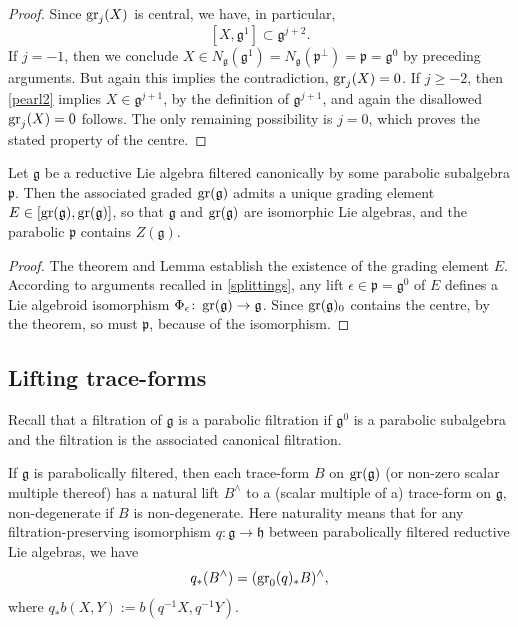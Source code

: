 \documentclass[leqno,12pt]{amsart} %
\begin{document}
\begin{proof}
  Since $\operatorname{\operatorname{gr}}_j(X)$ is central, we have, in particular,
  \begin{equation}
    \label{pearl2}
    [X, {\mathfrak g}^1] \subset {\mathfrak g}^{j+2}.
  \end{equation}
  If $j = -1$, then we conclude $X \in N_{\mathfrak g}({\mathfrak g}^1)=N_{\mathfrak g}({\mathfrak p}^\perp)={\mathfrak p}={\mathfrak g}^0$ by preceding arguments. But again this implies the contradiction, $\operatorname{\operatorname{gr}}_j(X)=0$.  If $j\ge -2$, then \eqref{pearl2} implies $X \in {\mathfrak g}^{j+1}$, by the definition of ${\mathfrak g}^{j+1}$, and again the disallowed $\operatorname{\operatorname{gr}}_j(X)=0$ follows. The only remaining possibility is $j=0$, which proves the stated property of the centre.
\end{proof}
\begin{corollary}
  Let ${\mathfrak g} $ be a reductive Lie algebra filtered canonically by some parabolic
  subalgebra ${\mathfrak p}$. Then the associated graded $\operatorname{\operatorname{gr}}({\mathfrak g})$ admits a
  unique grading element $E \in [\operatorname{\operatorname{gr}}({\mathfrak g}), \operatorname{\operatorname{gr}}({\mathfrak g})]$, so that
  ${\mathfrak g} $ and $\operatorname{\operatorname{gr}}({\mathfrak g}) $ are isomorphic Lie algebras, and the
  parabolic ${\mathfrak p} $ contains $Z({\mathfrak g})$.
\end{corollary}
\begin{proof}
  The theorem and Lemma  establish the existence of the grading element
  $E$. According to arguments recalled in \ref{splittings}, any lift
  $\epsilon \in {\mathfrak p}={\mathfrak g}^0$ of $E$ defines a Lie algebroid isomorphism
  $\Phi_\epsilon \colon \operatorname{\operatorname{gr}}({\mathfrak g}) \rightarrow {\mathfrak g} $. Since
  $\operatorname{\operatorname{gr}}({\mathfrak g})_0$ contains the centre, by the theorem, so must
  ${\mathfrak p} $, because of the isomorphism.
\end{proof}

\subsection{Lifting trace-forms}\label{lift}

Recall that a filtration of ${\mathfrak g} $ is a {\df parabolic filtration} if
${\mathfrak g}^0$ is a parabolic subalgebra and the filtration is the associated canonical
filtration.

\begin{proposition} If ${\mathfrak g} $ is parabolically filtered, then each trace-form
  $B$ on $\operatorname{\operatorname{gr}} ({\mathfrak g})$ (or non-zero scalar multiple thereof) has a {\df
    natural lift} $B^\wedge$ to a (scalar multiple of a) trace-form on ${\mathfrak g} $,
  non-degenerate if $B$ is non-degenerate. Here naturality means that for any
  filtration-preserving isomorphism $q \colon {\mathfrak g} \rightarrow {\mathfrak h} $
  between parabolically filtered reductive Lie algebras, we have
\begin{equation}
  \label{liftb}
  q_*(B^\wedge) = (\operatorname{\operatorname{gr}}_0(q)_*B)^\wedge,
\end{equation}
where $q_*b(X,Y) := b(q^{-1}X, q^{-1}Y)$.
\end{proposition}
\end{document}
